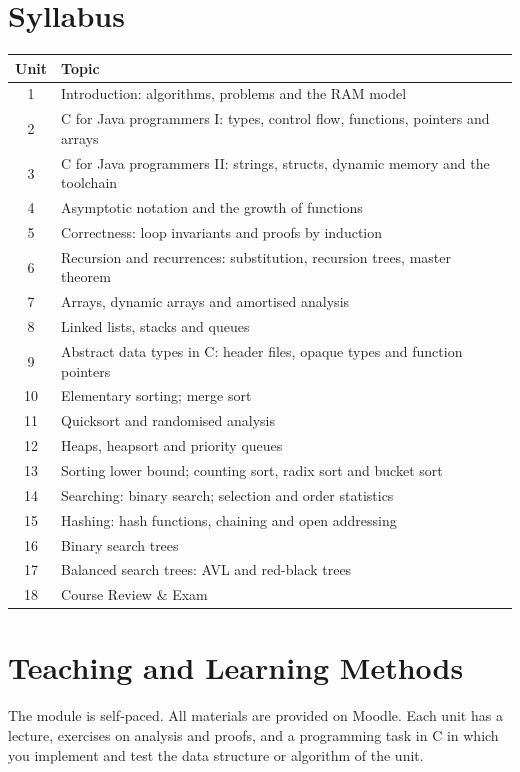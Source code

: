 \documentclass[11pt,a4paper]{article}
\begin{document}
\section{Syllabus}
\begin{tabularx}{\textwidth}{c X}
\toprule
\textbf{Unit} & \textbf{Topic} \\
\midrule
1  & Introduction: algorithms, problems and the RAM model \\
2  & C for Java programmers I: types, control flow, functions, pointers and arrays \\
3  & C for Java programmers II: strings, structs, dynamic memory and the toolchain \\
4  & Asymptotic notation and the growth of functions \\
5  & Correctness: loop invariants and proofs by induction \\
6  & Recursion and recurrences: substitution, recursion trees, master theorem \\
7  & Arrays, dynamic arrays and amortised analysis \\
8  & Linked lists, stacks and queues \\
9  & Abstract data types in C: header files, opaque types and function pointers \\
10 & Elementary sorting; merge sort \\
11 & Quicksort and randomised analysis \\
12 & Heaps, heapsort and priority queues \\
13 & Sorting lower bound; counting sort, radix sort and bucket sort \\
14 & Searching: binary search; selection and order statistics \\
15 & Hashing: hash functions, chaining and open addressing \\
16 & Binary search trees \\
17 & Balanced search trees: AVL and red-black trees \\
18 & Course Review \& Exam \\
\bottomrule
\end{tabularx}

\section{Teaching and Learning Methods}
The module is self-paced. All materials are provided on Moodle.
Each unit has a lecture, exercises on analysis and proofs, and a programming task in
C in which you implement and test the data structure or algorithm of the unit.
\end{document}
